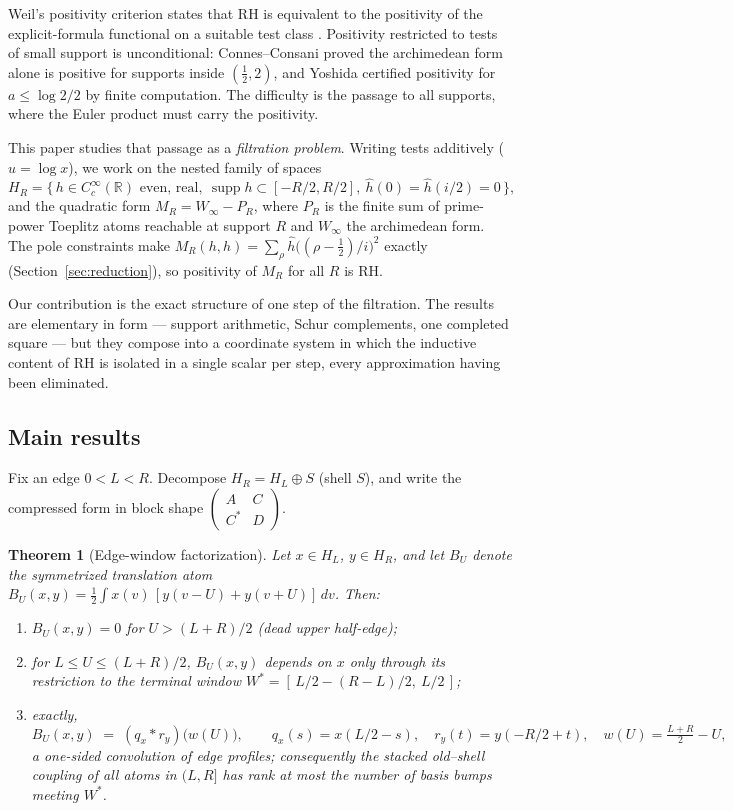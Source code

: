 \documentclass[11pt,reqno]{amsart}
\theoremstyle{plain}
\newtheorem{theorem}{Theorem}
\theoremstyle{definition}
\theoremstyle{remark}
\newcommand{\R}{\mathbb{R}}
\newcommand{\supp}{\operatorname{supp}}
\begin{document}
Weil's positivity criterion states that RH is equivalent to the positivity of the explicit-formula
functional on a suitable test class \cite{Weil52,Bombieri00,Yoshida92}. Positivity restricted to
tests of small support is unconditional: Connes--Consani \cite{CC20} proved the archimedean form
alone is positive for supports inside $(\tfrac12, 2)$, and Yoshida \cite{Yoshida92} certified
positivity for $a \le \log 2/2$ by finite computation. The difficulty is the passage to all
supports, where the Euler product must carry the positivity.

This paper studies that passage as a \emph{filtration problem}. Writing tests additively
($u = \log x$), we work on the nested family of spaces
\[
H_R = \big\{\, h \in C_c^\infty(\R) \text{ even, real},\ \supp h \subset [-R/2, R/2],\
\hat h(0) = \hat h(i/2) = 0 \,\big\},
\]
and the quadratic form $M_R = W_\infty - P_R$, where $P_R$ is the finite sum of prime-power
Toeplitz atoms reachable at support $R$ and $W_\infty$ the archimedean form. The pole
constraints make $M_R(h,h) = \sum_\rho \hat h\big((\rho-\tfrac12)/i\big)^2$ exactly
(Section~\ref{sec:reduction}), so positivity of $M_R$ for all $R$ is RH.

Our contribution is the exact structure of one step of the filtration. The results are
elementary in form --- support arithmetic, Schur complements, one completed square --- but
they compose into a coordinate system in which the inductive content of RH is isolated in a
single scalar per step, every approximation having been eliminated.

\subsection{Main results}

Fix an edge $0 < L < R$. Decompose $H_R = H_L \oplus S$ (shell $S$), and write the
compressed form in block shape $\begin{pmatrix} A & C \\ C^* & D\end{pmatrix}$.

\begin{theorem}[Edge-window factorization]\label{thm:edge}
Let $x \in H_L$, $y \in H_R$, and let $B_U$ denote the symmetrized translation atom
$B_U(x,y) = \tfrac12\!\int x(v)\,[y(v-U) + y(v+U)]\,dv$. Then:
\begin{enumerate}
\item[(a)] $B_U(x,y) = 0$ for $U > (L+R)/2$ \emph{(dead upper half-edge)};
\item[(b)] for $L \le U \le (L+R)/2$, $B_U(x,y)$ depends on $x$ only through its restriction
to the terminal window $W^* = [\,L/2-(R-L)/2,\ L/2\,]$;
\item[(c)] exactly,
\[
B_U(x,y) \;=\; (q_x * r_y)\big(w(U)\big), \qquad
q_x(s) = x(L/2 - s),\quad r_y(t) = y(-R/2+t),\quad w(U) = \tfrac{L+R}{2} - U ,
\]
a one-sided convolution of edge profiles; consequently the stacked old--shell coupling of all
atoms in $(L,R]$ has rank at most the number of basis bumps meeting $W^*$.
\end{enumerate}
\end{theorem}
\end{document}
